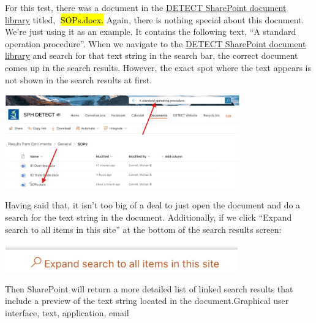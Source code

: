 \documentclass[
  letterpaper,
  DIV=11,
  numbers=noendperiod]{scrreprt}
\begin{document}
For this test, there was a document in the
\href{https://uthtmc.sharepoint.com/sites/SPHDETECT-RPC/Shared\%20Documents/Forms/AllItems.aspx?csf=1&web=1&e=FZ7xxt&FolderCTID=0x0120004E8A92AA55795C42852C8A438D043D68&viewid=37263261\%2D85dd\%2D48f3\%2D9aae\%2D93321747db5e}{DETECT
SharePoint document library} titled, 🔴\hl{SOPs.docx.} Again, there is
nothing special about this document. We're just using it as an example.
It contains the following text, ``A standard operation procedure''. When
we navigate to the
\href{https://uthtmc.sharepoint.com/sites/SPHDETECT-RPC/Shared\%20Documents/Forms/AllItems.aspx?csf=1&web=1&e=FZ7xxt&FolderCTID=0x0120004E8A92AA55795C42852C8A438D043D68&viewid=37263261\%2D85dd\%2D48f3\%2D9aae\%2D93321747db5e}{DETECT
SharePoint document library} and search for that text string in the
search bar, the correct document comes up in the search results.
However, the exact spot where the text appears is not shown in the
search results at first.

\begin{center}
\includegraphics[width=3.99in,height=\textheight]{chapters/authoring_sops/../../graphics/share_point.png}
\end{center}

Having said that, it isn't too big of a deal to just open the document
and do a search for the text string in the document. Additionally, if we
click ``Expand search to all items in this site'' at the bottom of the
search results screen:

\begin{center}
\includegraphics[width=3.96in,height=\textheight]{chapters/authoring_sops/../../graphics/expand_search.png}
\end{center}

Then SharePoint will return a more detailed list of linked search
results that include a preview of the text string located in the
document.Graphical user interface, text, application, email
\end{document}
